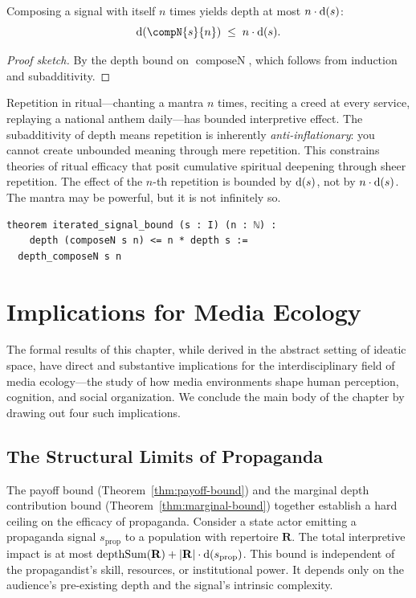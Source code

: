 \begin{theorem}
\label{thm:iterated-signal}
Composing a signal with itself $n$ times yields depth at most $n \cdot \operatorname{d}(s)$:
\[
  \depth(\compN{s}{n}) \;\le\; n \cdot \depth(s).
\]
\end{theorem}

\begin{proof}[Proof sketch]
By the depth bound on $\operatorname{composeN}$, which follows from induction
and subadditivity.
\end{proof}

Repetition in ritual---chanting a mantra $n$ times, reciting a creed at every
service, replaying a national anthem daily---has bounded interpretive effect.
The subadditivity of depth means repetition is inherently
\emph{anti-inflationary}: you cannot create unbounded meaning through mere
repetition.  This constrains theories of ritual efficacy that posit cumulative
spiritual deepening through sheer repetition.  The effect of the $n$-th
repetition is bounded by $\operatorname{d}(s)$, not by $n \cdot \operatorname{d}(s)$.  The mantra
may be powerful, but it is not infinitely so.

\begin{lstlisting}[caption={Iterated signal depth bound in Lean~4}]
theorem iterated_signal_bound (s : I) (n : ℕ) :
    depth (composeN s n) <= n * depth s :=
  depth_composeN s n
\end{lstlisting}

\section{Implications for Media Ecology}
\label{sec:ch11-media}

The formal results of this chapter, while derived in the abstract setting of
ideatic space, have direct and substantive implications for the interdisciplinary
field of media ecology---the study of how media environments shape human
perception, cognition, and social organization.  We conclude the main body of
the chapter by drawing out four such implications.

\subsection{The Structural Limits of Propaganda}

The payoff bound (Theorem~\ref{thm:payoff-bound}) and the marginal depth
contribution bound (Theorem~\ref{thm:marginal-bound}) together establish a
hard ceiling on the efficacy of propaganda.  Consider a state actor emitting
a propaganda signal $s_{\text{prop}}$ to a population with repertoire
$\mathbf{R}$.  The total interpretive impact is at most
$\operatorname{depthSum}(\mathbf{R}) + |\mathbf{R}| \cdot
\operatorname{d}(s_{\text{prop}})$.  This bound is independent of the propagandist's
skill, resources, or institutional power.  It depends only on the audience's
pre-existing depth and the signal's intrinsic complexity.

